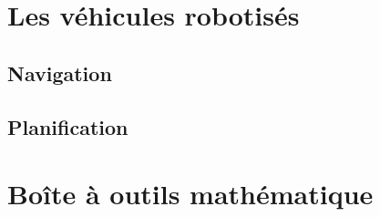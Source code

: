\documentclass[letterpaper,oneside,french]{book}
\begin{document}
\part{Les véhicules robotisés}
\label{sec:mobilerobot}



\chapter{Navigation}
\chapter{Planification}

\part{Boîte à outils mathématique}
\label{sec:math}










\nocite{*}
\newpage
%



\appendix




% 
\end{document}
